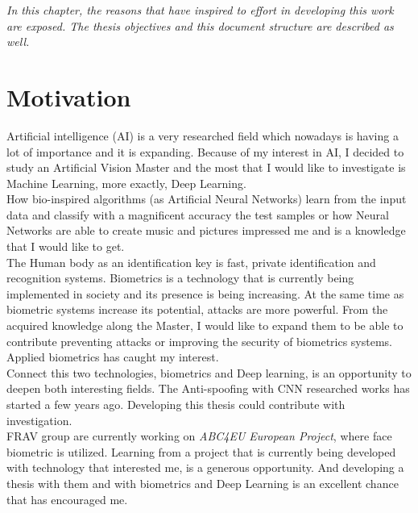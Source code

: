 \minitoc
\mtcskip

\begin{small}
\emph{In this chapter, the reasons that have inspired to effort in developing this work are exposed. The thesis objectives and this document structure are described as well.\\}
\end{small}
\section{Motivation}
Artificial intelligence (AI) is a very researched field which nowadays is having a lot of importance and it is expanding. Because of my interest in AI,  I decided to study an Artificial Vision Master and the most that I would like to investigate is Machine Learning, more exactly, Deep Learning.\\

How bio-inspired algorithms (as Artificial Neural Networks) learn from the input data and classify with a magnificent accuracy the test samples or how Neural Networks are able to create music and pictures impressed me and is a knowledge that I would like to get.\\

The Human body as an identification key is fast, private identification and recognition systems. Biometrics is a technology that is currently being implemented in society and its presence is being increasing. At the same time as biometric systems increase its potential, attacks are more powerful. From the acquired knowledge along the Master, I would like to expand them to be able to contribute preventing attacks or improving the security of biometrics systems. Applied biometrics has caught my interest. \\

Connect this two technologies, biometrics and Deep learning, is an opportunity to deepen both interesting fields. The Anti-spoofing with CNN researched works has started a few years ago. Developing this thesis could contribute with investigation.\\

FRAV group are currently working on \textit{ABC4EU European Project}, where face biometric is utilized. Learning from a project that is currently being developed with technology that interested me, is a generous opportunity. And developing a thesis with them and with biometrics and Deep Learning is an excellent chance that has encouraged me.\\

